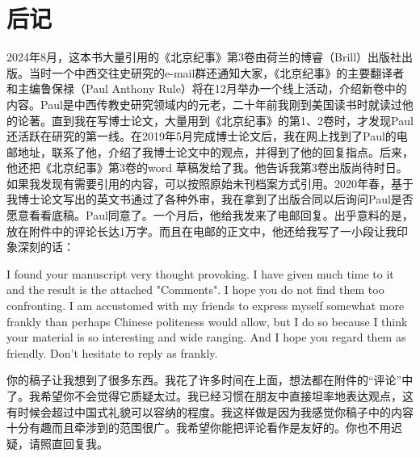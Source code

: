 \chapter*{后记}

2024年8月，这本书大量引用的《北京纪事》第3卷由荷兰的博睿（Brill）出版社出版。当时一个中西交往史研究的e-mail群还通知大家，《北京纪事》的主要翻译者和主编鲁保禄（Paul Anthony Rule）将在12月举办一个线上活动，介绍新卷中的内容。Paul是中西传教史研究领域内的元老，二十年前我刚到美国读书时就读过他的论著。直到我在写博士论文，大量用到《北京纪事》的第1、2卷时，才发现Paul还活跃在研究的第一线。在2019年5月完成博士论文后，我在网上找到了Paul的电邮地址，联系了他，介绍了我博士论文中的观点，并得到了他的回复指点。后来，他还把《北京纪事》第3卷的word 草稿发给了我。他告诉我第3卷出版尚待时日。如果我发现有需要引用的内容，可以按照原始未刊档案方式引用。2020年春，基于我博士论文写出的英文书通过了各种外审，我在拿到了出版合同以后询问Paul是否愿意看看底稿。Paul同意了。一个月后，他给我发来了电邮回复。出乎意料的是，放在附件中的评论长达1万字。而且在电邮的正文中，他还给我写了一小段让我印象深刻的话：



\begin{bookquote}I found your manuscript very thought provoking. I have given much time to it and the result is the attached "Comments". I hope you do not find them too confronting. I am accustomed with my friends to express myself somewhat more frankly than perhaps Chinese politeness would allow, but I do so because I think your material is so interesting and wide ranging. And I hope you regard them as friendly. Don't hesitate to reply as frankly.\end{bookquote}


\begin{bookquote}你的稿子让我想到了很多东西。我花了许多时间在上面，想法都在附件的“评论”中了。我希望你不会觉得它质疑太过。我已经习惯在朋友中直接坦率地表达观点，这有时候会超过中国式礼貌可以容纳的程度。我这样做是因为我感觉你稿子中的内容十分有趣而且牵涉到的范围很广。我希望你能把评论看作是友好的。你也不用迟疑，请照直回复我。\end{bookquote}


